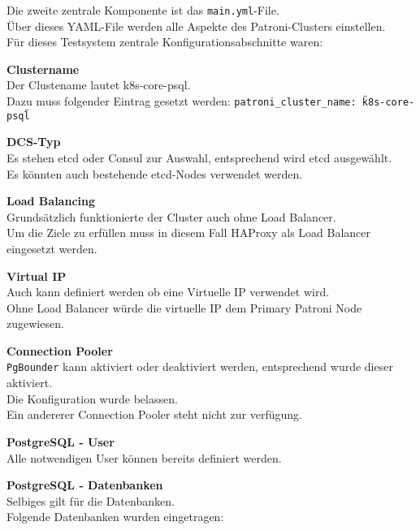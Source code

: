 \begin{flushleft}
    Die zweite zentrale Komponente ist das \texttt{main.yml}-File.\\
    Über dieses YAML-File werden alle Aspekte des Patroni-Clusters einstellen.\\
    Für dieses Testsystem zentrale Konfigurationsabschnitte waren:
    \begin{description}
        \item \textbf{Clustername}\hfill \\Der Clustename lautet \guillemotleft k8s-core-psql\guillemotright.\\Dazu muss folgender Eintrag gesetzt werden: \texttt{patroni\_cluster\_name: \"k8s-core-psql\"}
        \item \textbf{\Gls{DCS}-Typ}\hfill \\Es stehen \gls{etcd} oder \Gls{Consul} zur Auswahl, entsprechend wird \gls{etcd} ausgewählt.\\Es könnten auch bestehende \gls{etcd}-Nodes verwendet werden.
        \item \textbf{Load Balancing}\hfill \\Grundsätzlich funktionierte der Cluster auch ohne Load Balancer.\\Um die Ziele zu erfüllen muss in diesem Fall \Gls{HAProxy} als Load Balancer eingesetzt werden.
        \item \textbf{Virtual IP}\hfill \\Auch kann definiert werden ob eine Virtuelle IP verwendet wird.\\Ohne Load Balancer würde die virtuelle IP dem Primary Patroni Node zugewiesen.
        \item \textbf{\Gls{Connection Pooler}}\hfill \\\texttt{PgBounder} kann aktiviert oder deaktiviert werden, entsprechend wurde dieser aktiviert.\\Die Konfiguration wurde belassen.\\Ein andererer \Gls{Connection Pooler} steht nicht zur verfügung.
        \item \textbf{PostgreSQL - User}\hfill \\Alle notwendigen User können bereits definiert werden.
        \item \textbf{PostgreSQL - Datenbanken}\hfill \\Selbiges gilt für die Datenbanken.\\Folgende Datenbanken wurden eingetragen:
        \begin{itemize}

\end{itemize}
\end{description}
\end{flushleft}
